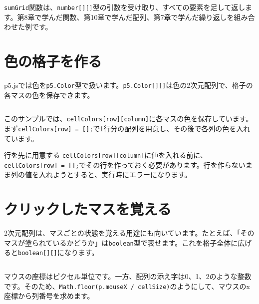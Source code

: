 \texttt{sumGrid}関数は、\texttt{number[][]}型の引数を受け取り、すべての要素を足して返します。第8章で学んだ関数、第10章で学んだ配列、第7章で学んだ繰り返しを組み合わせた例です。

\section{色の格子を作る}

p5.jsでは色を\texttt{p5.Color}型で扱います。\texttt{p5.Color[][]}は色の2次元配列で、格子の各マスの色を保存できます。

\begin{listing}[htbp]
\inputminted{ts}{typescript-p5/listings/chapter13/random-color-grid.ts}
\caption{\texttt{p5.Color[][]}で色の格子を作る（\texttt{chapter13/random-color-grid.ts}）}
\label{lst:chapter13-random-color-grid}
\end{listing}

このサンプルでは、\texttt{cellColors[row][column]}に各マスの色を保存しています。まず\texttt{cellColors[row] = [];}で1行分の配列を用意し、その後で各列の色を入れています。

\begin{notebox}{行を先に用意する}
\texttt{cellColors[row][column]}に値を入れる前に、\texttt{cellColors[row] = [];}でその行を作っておく必要があります。行を作らないまま列の値を入れようとすると、実行時にエラーになります。
\end{notebox}

\section{クリックしたマスを覚える}

2次元配列は、マスごとの状態を覚える用途にも向いています。たとえば、「そのマスが塗られているかどうか」は\texttt{boolean}型で表せます。これを格子全体に広げると\texttt{boolean[][]}になります。

\begin{listing}[htbp]
\inputminted{ts}{typescript-p5/listings/chapter13/click-toggle-grid.ts}
\caption{\texttt{boolean[][]}でクリックしたマスを切り替える（\texttt{chapter13/click-toggle-grid.ts}）}
\label{lst:chapter13-click-toggle-grid}
\end{listing}

マウスの座標はピクセル単位です。一方、配列の添え字は0、1、2のような整数です。そのため、\texttt{Math.floor(p.mouseX / cellSize)}のようにして、マウスのx座標から列番号を求めます。

